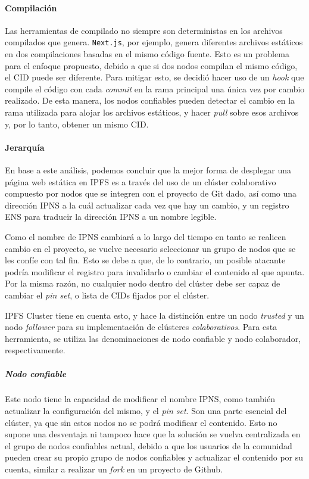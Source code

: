 \paragraph{Compilación}

Las herramientas de compilado no siempre son deterministas en los archivos compilados que genera. \texttt{Next.js}, por ejemplo, genera diferentes archivos estáticos en dos compilaciones basadas en el mismo código fuente. Esto es un problema para el enfoque propuesto, debido a que si dos nodos compilan el mismo código, el CID puede ser diferente. Para mitigar esto, se decidió hacer uso de un \textit{hook} que compile el código con cada \textit{commit} en la rama principal una única vez por cambio realizado. De esta manera, los nodos confiables pueden detectar el cambio en la rama utilizada para alojar los archivos estáticos, y hacer \textit{pull} sobre esos archivos y, por lo tanto, obtener un mismo CID.

\paragraph{Jerarquía}

En base a este análisis, podemos concluir que la mejor forma de desplegar una página web estática en IPFS es a través del uso de un clúster colaborativo compuesto por nodos que se integren con el proyecto de Git dado, así como una dirección IPNS a la cuál actualizar cada vez que hay un cambio, y un registro ENS para traducir la dirección IPNS a un nombre legible.

Como el nombre de IPNS cambiará a lo largo del tiempo en tanto se realicen cambio en el proyecto, se vuelve necesario seleccionar un grupo de nodos que se les confíe con tal fin. Esto se debe a que, de lo contrario, un posible atacante podría modificar el registro para invalidarlo o cambiar el contenido al que apunta. Por la misma razón, no cualquier nodo dentro del clúster debe ser capaz de cambiar el \textit{pin set}, o lista de CIDs fijados por el clúster.

IPFS Cluster tiene en cuenta esto, y hace la distinción entre un nodo \textit{trusted} y un nodo \textit{follower} para su implementación de clústeres \textit{colaborativos}\cite{ipfs-cluster-collaborative}. Para esta herramienta, se utiliza las denominaciones de nodo confiable y nodo colaborador, respectivamente.

\subparagraph{Nodo confiable} Este nodo tiene la capacidad de modificar el nombre IPNS, como también actualizar la configuración del mismo, y el \textit{pin set}. Son una parte esencial del clúster, ya que sin estos nodos no se podrá modificar el contenido. Esto no supone una desventaja ni tampoco hace que la solución se vuelva centralizada en el grupo de nodos confiables actual, debido a que los usuarios de la comunidad pueden crear su propio grupo de nodos confiables y actualizar el contenido por su cuenta, similar a realizar un \textit{fork} en un proyecto de Github.

